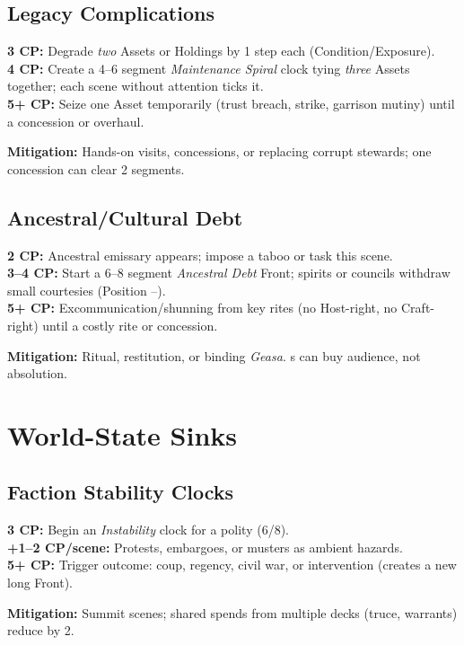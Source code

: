 \subsection{Legacy Complications}
\begin{tcolorbox}[enhanced,sharp corners,boxrule=.6pt,title={CP Menu}]
\textbf{3 CP:} Degrade \emph{two} Assets or Holdings by 1 step each (Condition/Exposure).\\
\textbf{4 CP:} Create a 4–6 segment \emph{Maintenance Spiral} clock tying \emph{three} Assets together; each scene without attention ticks it.\\
\textbf{5+ CP:} Seize one Asset temporarily (trust breach, strike, garrison mutiny) until a concession or overhaul.
\end{tcolorbox}
\textbf{Mitigation:} Hands-on visits, concessions, or replacing corrupt stewards; one concession can clear 2 segments.

\subsection{Ancestral/Cultural Debt}
\begin{tcolorbox}[enhanced,sharp corners,boxrule=.6pt,title={CP Menu}]
\textbf{2 CP:} Ancestral emissary appears; impose a taboo or task this scene.\\
\textbf{3--4 CP:} Start a 6–8 segment \emph{Ancestral Debt} Front; spirits or councils withdraw small courtesies (Position --).\\
\textbf{5+ CP:} Excommunication/shunning from key rites (no Host-right, no Craft-right) until a costly rite or concession.
\end{tcolorbox}
\textbf{Mitigation:} Ritual, restitution, or binding \emph{Geasa}. \SuitDiamond{}s can buy audience, not absolution.

\section{World-State Sinks}
\subsection{Faction Stability Clocks}
\begin{tcolorbox}[enhanced,sharp corners,boxrule=.6pt,title={CP Menu}]
\textbf{3 CP:} Begin an \emph{Instability} clock for a polity (6/8).\\
\textbf{+1--2 CP/scene:} Protests, embargoes, or musters as ambient hazards.\\
\textbf{5+ CP:} Trigger outcome: coup, regency, civil war, or intervention (creates a new long Front).
\end{tcolorbox}
\textbf{Mitigation:} Summit scenes; shared \SuitDiamond{} spends from multiple decks (truce, warrants) reduce by 2.

